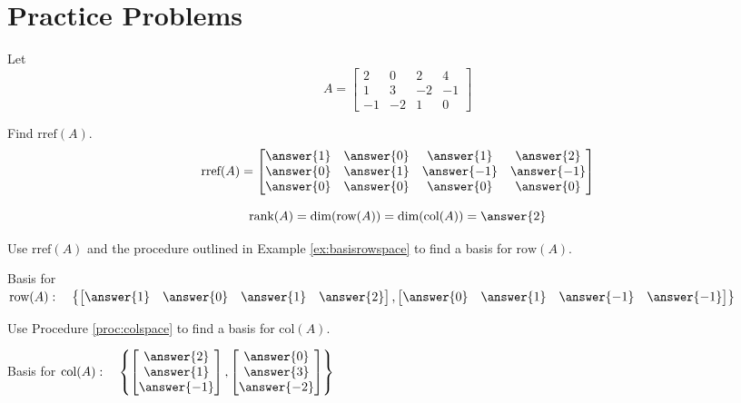 \documentclass{ximera}
\begin{document}
\section*{Practice Problems}
\begin{problem}
Let
$$A=\begin{bmatrix}2&0&2&4\\1&3&-2&-1\\-1&-2&1&0\end{bmatrix}$$

\begin{problem}\label{prob:colrowmatrixA1}
Find $\mbox{rref}(A)$.
$$\mbox{rref}(A)=\begin{bmatrix}\answer{1}&\answer{0}&\answer{1}&\answer{2}\\\answer{0}&\answer{1}&\answer{-1}&\answer{-1}\\\answer{0}&\answer{0}&\answer{0}&\answer{0}\end{bmatrix}$$
\end{problem}

\begin{problem}\label{prob:colrowmatrixA2}
$$\mbox{rank}(A)=\mbox{dim}(\mbox{row}(A))=\mbox{dim}(\mbox{col}(A))=\answer{2}$$
\end{problem}

\begin{problem}\label{prob:colrowmatrixA3}
Use $\mbox{rref}(A)$ and the procedure outlined in Example \ref{ex:basisrowspace} to find a basis for $\mbox{row}(A)$.

Basis for $\mbox{row}(A):\quad
\left\{\begin{bmatrix}\answer{1}& \answer{0}& \answer{1} & \answer{2}\end{bmatrix},\begin{bmatrix}\answer{0} & \answer{1}& \answer{-1} &\answer{-1}\end{bmatrix} \right\}$
\end{problem}

\begin{problem}\label{prob:colrowmatrixA4}
Use Procedure \ref{proc:colspace} to find a basis for $\mbox{col}(A)$.

Basis for $\mbox{col}(A):\quad
\left\{ \begin{bmatrix}\answer{2}\\\answer{1}\\\answer{-1}\end{bmatrix}, \begin{bmatrix}\answer{0}\\\answer{3}\\\answer{-2}\end{bmatrix}\right\}$
\end{problem}

\end{problem}
\end{document}
